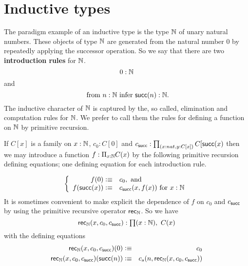 

\section{Inductive types}
\label{sec:inductive-types}

The paradigm example of an inductive type is the type $\mathbb{N}$ of unary natural numbers.  These objects of type $\mathbb{N}$ are generated from the natural number $0$ by repeatedly applying the successor operation.  So we say that there are two {\bf introduction rules} for $\mathbb{N}$. 
  \[ 0:\mathbb{N}\]
and
  \[ \mbox{ from $n:\mathbb{N}$ infer $\mathsf{succ}(n):\mathbb{N}$}.\]
The inductive character of $\mathbb{N}$ is captured by the, so called, elimination and computation rules for $\mathbb{N}$.  We prefer to call them the rules for defining a function on $\mathbb{N}$ by primitive recursion. 

If $C[x]$ is a family on $x:\mathbb{N}$, $c_0:C[0]$ and $c_\suc:\prd{x:nat,y:C[x]}C[\suc(x)$ then we may introduce a function $f:\Pi_{x:\mathbb{N}}C(x)$ by the following primitive recursion defining equations; one defining equation for each introduction rule.

  \[\left\{\begin{array}{rl}
f(0)\vcentcolon\equiv& c_0, \mbox{ and}\\
f(\mathsf{succ}(x))\vcentcolon\equiv& c_{\mathsf{succ}}(x,f(x))\mbox{ for } x:\mathbb{N}
  \end{array}\right.\]
It is sometimes convenient to make explicit the dependence of $f$ on $c_0$ and $c_{\mathsf{succ}}$ by using the primitive recursive operator $\mathsf{rec}_{\mathbb{N}}$.  So we have
  \[ \rec{\nat}(x,c_0,c_\suc):\prd{x:\nat}C(x)\]
with the defining equations
\begin{eqnarray*}
  \mathsf{rec}_{\mathbb{N}}(x,c_0,c_{\mathsf{succ}})(0) & \vcentcolon\equiv & c_0 \\
  \mathsf{rec}_{\mathbb{N}}(x,c_0,c_{\mathsf{succ}})(\mathsf{succ}(n)) & \vcentcolon\equiv & c_s(n, \mathsf{rec}_{\mathbb{N}}(x,c_0,c_{\mathsf{succ}})) \\
\end{eqnarray*}

